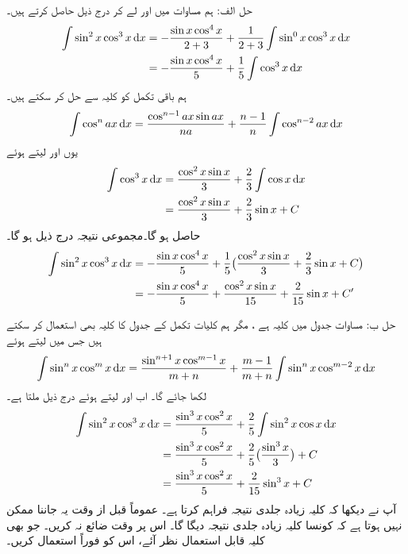 حل الف:\quad
ہم مساوات  میں  اور  لے کر درج ذیل حاصل کرتے ہیں۔
\begin{align*}
\int \sin^2x\cos^3x\dif x&=-\frac{\sin x\cos^4x}{2+3}+\frac{1}{2+3}\int\sin^0x\cos^3x\dif x\\
&=-\frac{\sin x\cos^4x}{5}+\frac{1}{5}\int\cos^3x\dif x
\end{align*}
ہم باقی تکمل کو کلیہ  سے حل کر سکتے ہیں۔
\begin{align*}
\int\cos^nax\dif x=\frac{\cos^{n-1}ax\sin ax}{na}+\frac{n-1}{n}\int\cos^{n-2}ax\dif x
\end{align*}
یوں  اور  لیتے ہوئے
 \begin{align*}
\int\cos^3x\dif x&=\frac{\cos^2x\sin x}{3}+\frac{2}{3}\int\cos x\dif x\\
&=\frac{\cos^2x\sin x}{3}+\frac{2}{3}\sin x+C
\end{align*}
حاصل ہو گا۔مجموعی نتیجہ درج ذیل ہو گا۔
\begin{align*}
\int\sin^2x\cos^3x\dif x &=-\frac{\sin x\cos^4x}{5}+\frac{1}{5}\big(\frac{\cos^2x\sin x}{3}+\frac{2}{3}\sin x+C\big)\\
&=-\frac{\sin x\cos^4 x}{5}+\frac{\cos^2x\sin x}{15}+\frac{2}{15}\sin x+C'
\end{align*}

حل ب:\quad
مساوات  جدول میں کلیہ  ہے ، مگر ہم کلیات تکمل کے جدول کا کلیہ  بھی استعمال کر سکتے ہیں جس میں  لیتے ہوئے
\begin{align*}
\int \sin^nx\cos^mx\dif x=\frac{\sin^{n+1}x\cos^{m-1}x}{m+n}+\frac{m-1}{m+n}\int \sin^nx\cos^{m-2}x\dif x
\end{align*}
لکھا جائے گا۔ اب  اور  لیتے ہوئے درج ذیل ملتا ہے۔
\begin{align*}
\int\sin^2x\cos^3x\dif x&=\frac{\sin^3x\cos^2x}{5}+\frac{2}{5}\int\sin^2x\cos x\dif x\\
&=\frac{\sin^3x\cos^2x}{5}+\frac{2}{5}\big(\frac{\sin^3x}{3}\big)+C\\
&=\frac{\sin^3x\cos^2x}{5}+\frac{2}{15}\sin^3x+C
\end{align*} 
آپ نے دیکھا کہ کلیہ   زیادہ جلدی نتیجہ فراہم کرتا ہے۔ عموماً قبل از وقت یہ جاننا ممکن نہیں ہوتا ہے کہ کونسا کلیہ زیادہ جلدی نتیجہ دیگا گا۔ اس پر وقت ضائع نہ کریں۔ جو بھی کلیہ قابل استعمال نظر آئے، اس کو فوراً استعمال کریں۔

